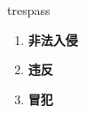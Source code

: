 
\begin{frame}
{\huge trespass}
\begin{center}
\begin{enumerate}\Large
  \item \textbf{非法入侵}
  \item \textbf{违反}
  \item \textbf{冒犯}
\end{enumerate}
\end{center}
\end{frame}
